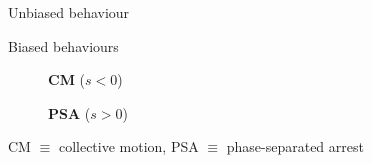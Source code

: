 \documentclass{beamer}
\renewcommand{\FigureFrom}[2]{
  [{\usebeamercolor[fg]{caption source} from:} \fullcite{#1}\ifblank{#2}{}{ (Fig.~#2)}]
}
\begin{document}
\begin{frame}{Unbiased behaviour}




\end{frame}

\begin{frame}{Biased behaviours}


\begin{figure}
\begin{minipage}{0.48\linewidth}
\centering
{\bf CM} ($s < 0$)
\end{minipage}
\hfill
\begin{minipage}{0.48\linewidth}
\centering
{\bf PSA} ($s > 0$)
\end{minipage}
\hfill\hfill
\end{figure}

\begin{center}
  CM $\equiv$ collective motion, PSA $\equiv$ phase-separated arrest
\end{center}

\end{frame}
\end{document}
